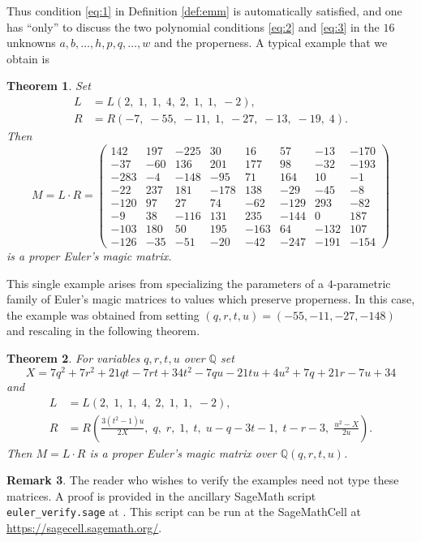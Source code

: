 \documentclass[12pt]{amsart}
\newtheorem{theorem}{Theorem}[section]
\theoremstyle{definition}
\newtheorem{remark}[theorem]{Remark}
\newcommand{\QQ}{\mathbb Q}
\begin{document}
Thus condition \eqref{eq:1} in Definition \ref{def:emm} is
automatically satisfied, and one has ``only'' to discuss the two
polynomial conditions \eqref{eq:2} and \eqref{eq:3} in the $16$
unknowns $a,b,\dots,h,p,q,\dots,w$ and the properness. A typical
example that we obtain is
\begin{theorem}
  Set 
  \begin{align*}
    L &= L(2,\; 1,\; 1,\; 4,\; 2,\; 1,\; 1,\; -2),\\
    R &= R(-7,\; -55,\; -11,\; 1,\; -27,\; -13,\; -19,\; 4).
  \end{align*}
  Then
  \[
    M = L\cdot R=%
\left(\begin{array}{rrrrrrrr}
142 & 197 & -225 & 30 & 16 & 57 & -13 & -170 \\
-37 & -60 & 136 & 201 & 177 & 98 & -32 & -193 \\
-283 & -4 & -148 & -95 & 71 & 164 & 10 & -1 \\
-22 & 237 & 181 & -178 & 138 & -29 & -45 & -8 \\
-120 & 97 & 27 & 74 & -62 & -129 & 293 & -82 \\
-9 & 38 & -116 & 131 & 235 & -144 & 0 & 187 \\
-103 & 180 & 50 & 195 & -163 & 64 & -132 & 107 \\
-126 & -35 & -51 & -20 & -42 & -247 & -191 & -154
\end{array}\right)
\]
is a proper Euler's magic matrix.
\end{theorem}
This single example arises from specializing the parameters of a
$4$-parametric family of Euler's magic matrices to values which
preserve properness. In this case, the example was obtained from
setting $(q, r, t, u) = (-55, -11, -27, -148)$ and rescaling in the
following theorem.
\begin{theorem}\label{t:8x8}
  For variables $q, r, t, u$ over $\QQ$ set
\[
  X = 7 q^{2} + 7 r^{2} + 21 q t - 7 r t + 34 t^{2} - 7 q u - 21 t%
  u + 4 u^{2} + 7 q + 21 r - 7 u + 34
\]
  and
  \begin{align*}
    L &= L(2,\; 1,\; 1,\; 4,\; 2,\; 1,\; 1,\; -2),\\
    R &= R\left(\frac{3(t^2 - 1)u}{2X},\; q,\; r,\; 1,\; t,\;%
        u-q-3t-1,\; t - r - 3,\; \frac{u^2-X}{2u}\right).
  \end{align*}
  Then $M=L\cdot R$ is a proper Euler's magic matrix over
  $\QQ(q,r,t,u)$.
\end{theorem}
\begin{remark}
  The reader who wishes to verify the examples need not type these
  matrices. A proof is provided in the ancillary SageMath script
  \texttt{euler\_verify.sage} at \cite{euler_verify}. This script can
  be run at the SageMathCell at \url{https://sagecell.sagemath.org/}.
\end{remark}
\end{document}
